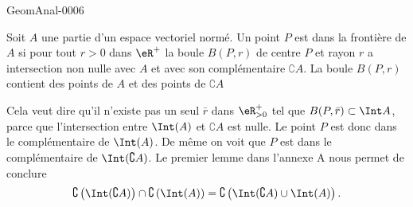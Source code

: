 \begin{corrige}{GeomAnal-0006}

Soit $A$ une partie d'un espace vectoriel normé. Un point $P$ est dans la frontière de $A$ si pour tout $r> 0$ dans $\eR^+$ la boule $B(P, r)$ de centre $P$ et rayon $r$ a intersection non nulle avec $A$ et avec son complémentaire $\complement A$. La boule $B(P, r)$ contient des points de $A$ et des points de $\complement A$ 

Cela veut dire qu'il n'existe pas un seul $\bar r$ dans $\eR^+_{>0}$ tel que $B(P,\bar r)\subset \Int A$, parce que l'intersection entre $ \Int (A)$ et $\complement A$ est nulle. Le point $P$ est donc dans le complémentaire de $\Int (A)$. De même on voit que  $P$ est  dans le complémentaire de $\Int(\complement A)$. Le premier lemme dans l'annexe A nous permet de conclure 
\[
\complement\left(\Int(\complement A)\right)\cap\complement\left(\Int(A)\right)=\complement\left(\Int(\complement A)\cup\Int( A)\right). 
\] 
\end{corrige}
